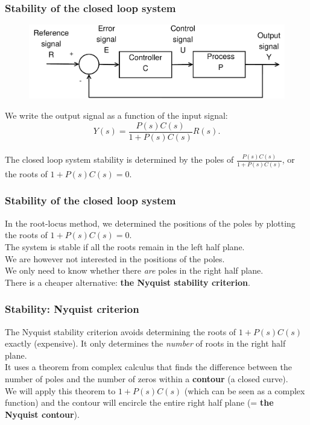 \begin{frame}
	\frametitle{Stability of the closed loop system}
	\begin{figure}
		\includegraphics[width=0.8\linewidth]{closedloop}
	\end{figure}
	We write the output signal as a function of the input signal: $$Y(s)=\frac{P(s)C(s)}{1+P(s)C(s)}R(s).$$\\
	The closed loop system stability is determined by the poles of $\frac{P(s)C(s)}{1+P(s)C(s)}$, or the roots of $1+P(s)C(s)=0$.
\end{frame}

\begin{frame}
	\frametitle{Stability of the closed loop system}
	\vspace{-8ex}
	In the root-locus method, we determined the positions of the poles by plotting the roots of $1+P(s)C(s)=0$.\\
	\medskip
	The system is stable if all the roots remain in the left half plane.\\
	\medskip
	We are however not interested in the positions of the poles.\\
	We only need to know whether there \textit{are} poles in the right half plane.\\
	\medskip
	There is a cheaper alternative: \textbf{the Nyquist stability criterion}.
\end{frame}

\begin{frame}
	\frametitle{Stability: Nyquist criterion}
	\vspace{-5ex}
	The Nyquist stability criterion avoids determining the roots of $1+P(s)C(s)$ exactly (expensive). It only determines the \textit{number} of roots in the right half plane.\\
	\medskip
	It uses a theorem from complex calculus that finds the difference between the number of poles and the number of zeros within a \textbf{contour} (a closed curve).\\
	\medskip
	We will apply this theorem to $1+P(s)C(s)$ (which can be seen as a complex function) and the contour will encircle the entire right half plane (= \textbf{the Nyquist contour}).
\end{frame}

